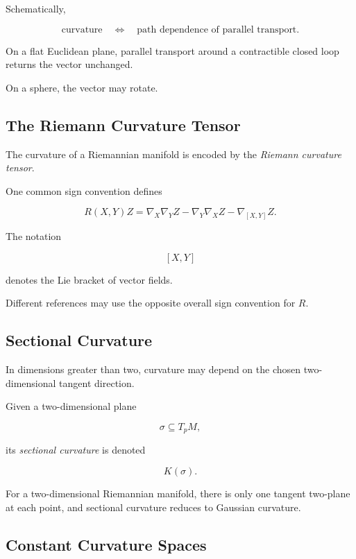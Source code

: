 Schematically,

\[
\boxed{
\text{curvature}
\quad\Longleftrightarrow\quad
\text{path dependence of parallel transport}.
}
\]

On a flat Euclidean plane, parallel transport around a contractible closed
loop returns the vector unchanged.

On a sphere, the vector may rotate.

\subsection{The Riemann Curvature Tensor}
\label{subsec:riemann-curvature-tensor}

The curvature of a Riemannian manifold is encoded by the
\emph{Riemann curvature tensor}.

One common sign convention defines

\[
\boxed{
R(X,Y)Z
=
\nabla_X\nabla_YZ
-
\nabla_Y\nabla_XZ
-
\nabla_{[X,Y]}Z.
}
\]

The notation

\[
[X,Y]
\]

denotes the Lie bracket of vector fields.

Different references may use the opposite overall sign convention for
\(R\).

\subsection{Sectional Curvature}
\label{subsec:sectional-curvature}

In dimensions greater than two, curvature may depend on the chosen
two-dimensional tangent direction.

Given a two-dimensional plane

\[
\sigma\subseteq T_pM,
\]

its \emph{sectional curvature} is denoted

\[
\boxed{K(\sigma).}
\]

For a two-dimensional Riemannian manifold, there is only one tangent
two-plane at each point, and sectional curvature reduces to Gaussian
curvature.

\subsection{Constant Curvature Spaces}
\label{subsec:constant-curvature-spaces}

